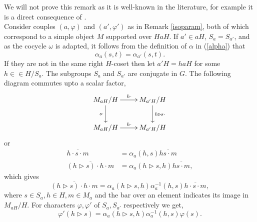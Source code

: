 \documentclass[a4paper, 10pt]{book}
\theoremstyle{definition}
\numberwithin{equation}{chapter}
\newcommand\hit{\triangleright}
\newcommand\inv{^{-1}}
\begin{document}
We will not prove this remark as it is well-known in the literature, for example it is a direct consequence of  \cite[Proposition 3.1]{Ost:MCDDFG}.\\
Consider couples $(a, \varphi)$ and  $(a', \varphi')$ as in Remark \ref{isoparam}, both of which correspond to a simple object $M$ supported over $HaH$. If $a' \in aH$, $S_a=S_{a'}$, and as the cocycle $\omega$ is adapted, it follows from the definition of $\alpha$ in (\ref{alpha}) that \begin{equation*}
	\alpha_a(s, t) = \alpha_{a'}(s, t).
\end{equation*} If they are not in the same right $H$-coset then let $a'H = haH$ for some $h\in \in H/S_{a}$. The subgroups $S_a$ and $S_{a'}$ are conjugate in $G$. The following diagram commutes upto a scalar factor, \[
	\xymatrix{M_{aH}/H \ar[d]_{s\cdot} \ar[r]^{h\cdot} & M_{{a'H}}/H \ar[d]^{h\hit s\cdot} \\
	M_{aH}/H\ar[r]^{h\cdot} & M_{{a'H}}/H}
\] or \begin{align}
\overline{h\cdot s\cdot m} &= \alpha_a(h, s) \overline{hs\cdot m} \\
\overline{(h\hit s)\cdot h\cdot m} &= \alpha_a(h\hit s, h) \overline{hs\cdot m},
\end{align} which gives \begin{equation*}
\overline{(h\hit s)\cdot h\cdot m} = 	\alpha_a(h\hit s, h)\alpha_a\inv(h, s) \overline{h\cdot s\cdot m},
\end{equation*}where $s\in S_a, h\in H, m\in M_a$ and the bar over an element indicates its image in $M_{aH}/H$. For characters $\varphi, \varphi'$ of $S_a, S_{a'}$ respectively we get, \begin{equation}\label{newchi}
	\varphi'(h\hit s) = \alpha_a(h\hit s, h)\alpha_a\inv(h, s) \varphi(s).
\end{equation} 
\end{document}
